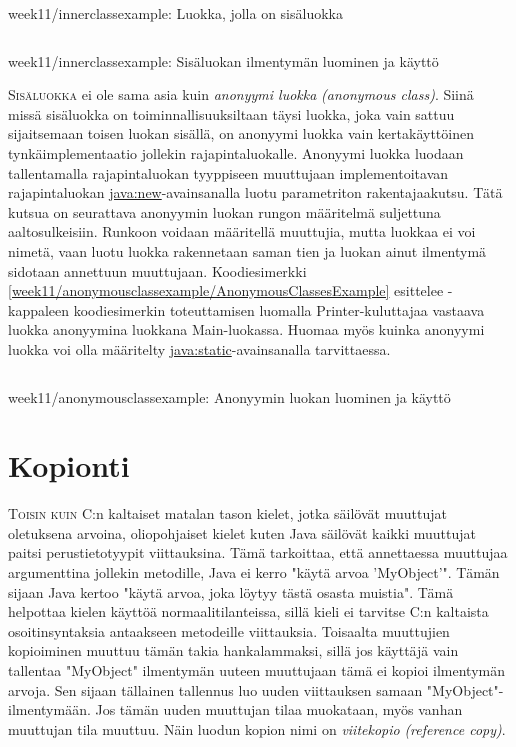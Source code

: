 \documentclass[openany]{book}
\newcommand{\newthought}[1]{\smallskip\textsc{#1}}
\newcommand{\eng}[1]{\textit{(#1)}}
\newcommand{\new}[1]{\textit{\gls{#1}}}
\newcommand{\neweng}[2]{\new{#1} \eng{#2}}
\newcommand{\java}[1]{\underline{\gls{java:#1}}}
\newcommand{\code}[3]{
	\begin{listing}
		\linespread{0.85}
		\inputminted{java}{OhjelmointiopasEsimerkit/src/#1/#2.java}
		\caption{#1: #3}
		\label{#1/#2}
	\end{listing}
}
\begin{document}
\code{week11/innerclassexample}{OuterClass}{Luokka, jolla on sisäluokka}
\code{week11/innerclassexample}{InnerClassesExample}{Sisäluokan ilmentymän luominen ja käyttö}

\newthought{Sisäluokka} ei ole sama asia kuin \neweng{anonyymi luokka}{anonymous class}. Siinä
missä sisäluokka on toiminnallisuuksiltaan täysi luokka, joka vain sattuu sijaitsemaan toisen 
luokan sisällä, on anonyymi luokka vain kertakäyttöinen tynkäimplementaatio jollekin
rajapintaluokalle. Anonyymi luokka luodaan tallentamalla rajapintaluokan tyyppiseen muuttujaan
implementoitavan rajapintaluokan \java{new}-avainsanalla luotu parametriton rakentajaakutsu. Tätä
kutsua on seurattava anonyymin luokan rungon määritelmä suljettuna aaltosulkeisiin. Runkoon
voidaan määritellä muuttujia, mutta luokkaa ei voi nimetä, vaan luotu luokka rakennetaan saman
tien ja luokan ainut ilmentymä sidotaan annettuun muuttujaan. Koodiesimerkki
\ref{week11/anonymousclassexample/AnonymousClassesExample} esittelee -kappaleen
koodiesimerkin toteuttamisen luomalla Printer-kuluttajaa vastaava luokka anonyymina luokkana
Main-luokassa. Huomaa myös kuinka anonyymi luokka voi olla määritelty \java{static}-avainsanalla
tarvittaessa.

\code{week11/anonymousclassexample}{AnonymousClassesExample}{Anonyymin luokan luominen ja käyttö}


\section{Kopionti}
\label{copying}

\newthought{Toisin kuin} C:n kaltaiset matalan tason kielet, jotka säilövät muuttujat oletuksena
arvoina, oliopohjaiset kielet kuten Java säilövät kaikki muuttujat paitsi perustietotyypit
viittauksina. Tämä tarkoittaa, että annettaessa muuttujaa argumenttina jollekin metodille, Java ei
kerro "käytä arvoa 'MyObject'". Tämän sijaan Java kertoo "käytä arvoa, joka löytyy tästä osasta
muistia". Tämä helpottaa kielen käyttöä normaalitilanteissa, sillä kieli ei tarvitse C:n kaltaista
osoitinsyntaksia antaakseen metodeille viittauksia. Toisaalta muuttujien kopioiminen muuttuu tämän
takia hankalammaksi, sillä jos käyttäjä vain tallentaa "MyObject" ilmentymän uuteen muuttujaan
tämä ei kopioi ilmentymän arvoja. Sen sijaan tällainen tallennus luo uuden viittauksen samaan
"MyObject"-ilmentymään. Jos tämän uuden muuttujan tilaa muokataan, myös vanhan muuttujan tila
muuttuu. Näin luodun kopion nimi on \neweng{viitekopio}{reference copy}.
\end{document}

